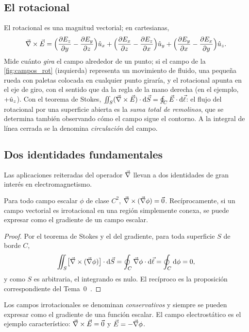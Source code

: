 \subsection{El rotacional}\label{app:rotacional}
El rotacional es una magnitud vectorial; en cartesianas,
\[
  \vec{\nabla}\times\vec{E}=\Bigl(\frac{\partial E_z}{\partial y}-\frac{\partial E_y}{\partial z}\Bigr)\hat{u}_{x}+\Bigl(\frac{\partial E_x}{\partial z}-\frac{\partial E_z}{\partial x}\Bigr)\hat{u}_{y}+\Bigl(\frac{\partial E_y}{\partial x}-\frac{\partial E_x}{\partial y}\Bigr)\hat{u}_{z} .
\]
Mide cuánto \emph{gira} el campo alrededor de un punto; si el campo de la \cref{fig:campos_rot} (izquierda) representa un movimiento de fluido, una pequeña rueda con paletas colocada en cualquier punto giraría, y el rotacional apunta en el eje
de giro, con el sentido que da la regla de la mano derecha (en el ejemplo, $+\hat{u}_{z}$). Con el teorema de Stokes, $\iint_{S}(\vec{\nabla}\times\vec{E})\cdot\mathrm{d}\vec{S}=\oint_{C}\vec{E}\cdot\mathrm{d}\vec{\ell}$: el flujo del rotacional por una superficie abierta es la \emph{suma total de remolinos}, que
se determina también observando cómo el campo sigue el contorno. A la integral de línea cerrada se la denomina \emph{circulación} del campo.



\subsection{Dos identidades fundamentales}\label{app:identidades}
Las aplicaciones reiteradas del operador $\vec{\nabla}$ llevan a dos identidades de gran interés en electromagnetismo.

\begin{proposicion}\label{prop:rot-grad}
Para todo campo escalar $\phi$ de clase $C^{2}$, $\vec{\nabla}\times(\vec{\nabla}\phi)=\vec{0}$. Recíprocamente, si un campo vectorial es irrotacional en una región simplemente conexa, se puede expresar como el gradiente de un campo escalar.
\end{proposicion}
\begin{proof}
Por el teorema de Stokes y el del gradiente, para toda superficie $S$ de borde $C$,
\[
  \iint_{S}\bigl[\vec{\nabla}\times(\vec{\nabla}\phi)\bigr]\cdot\mathrm{d}\vec{S}=\oint_{C}\vec{\nabla}\phi\cdot\mathrm{d}\vec{\ell}=\oint_{C}\mathrm{d}\phi=0,
\]
y como $S$ es arbitraria, el integrando es nulo. El recíproco es la proposición correspondiente del Tema~0~\cite{TEMA0}.
\end{proof}
Los campos irrotacionales se denominan \emph{conservativos} y siempre se pueden expresar como el gradiente de una función escalar. El campo electrostático es el ejemplo característico: $\vec{\nabla}\times\vec{E}=\vec{0}$ y $\vec{E}=-\vec{\nabla}\phi$.

